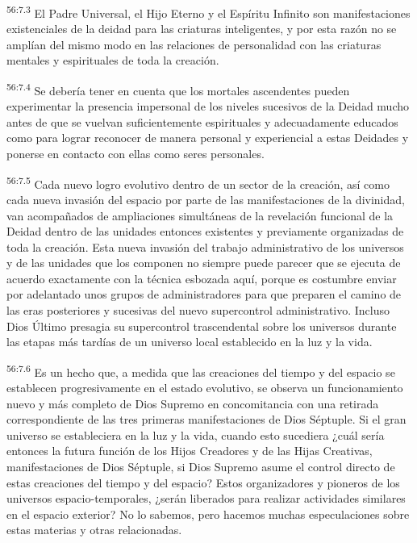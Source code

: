 \par
\textsuperscript{56:7.3} El Padre Universal, el Hijo Eterno y el Espíritu Infinito son manifestaciones existenciales de la deidad para las criaturas inteligentes, y por esta razón no se amplían del mismo modo en las relaciones de personalidad con las criaturas mentales y espirituales de toda la creación.

\par
\textsuperscript{56:7.4} Se debería tener en cuenta que los mortales ascendentes pueden experimentar la presencia impersonal de los niveles sucesivos de la Deidad mucho antes de que se vuelvan suficientemente espirituales y adecuadamente educados como para lograr reconocer de manera personal y experiencial a estas Deidades y ponerse en contacto con ellas como seres personales.

\par
\textsuperscript{56:7.5} Cada nuevo logro evolutivo dentro de un sector de la creación, así como cada nueva invasión del espacio por parte de las manifestaciones de la divinidad, van acompañados de ampliaciones simultáneas de la revelación funcional de la Deidad dentro de las unidades entonces existentes y previamente organizadas de toda la creación. Esta nueva invasión del trabajo administrativo de los universos y de las unidades que los componen no siempre puede parecer que se ejecuta de acuerdo exactamente con la técnica esbozada aquí, porque es costumbre enviar por adelantado unos grupos de administradores para que preparen el camino de las eras posteriores y sucesivas del nuevo supercontrol administrativo. Incluso Dios Último presagia su supercontrol trascendental sobre los universos durante las etapas más tardías de un universo local establecido en la luz y la vida.

\par
\textsuperscript{56:7.6} Es un hecho que, a medida que las creaciones del tiempo y del espacio se establecen progresivamente en el estado evolutivo, se observa un funcionamiento nuevo y más completo de Dios Supremo en concomitancia con una retirada correspondiente de las tres primeras manifestaciones de Dios Séptuple. Si el gran universo se estableciera en la luz y la vida, cuando esto sucediera ¿cuál sería entonces la futura función de los Hijos Creadores y de las Hijas Creativas, manifestaciones de Dios Séptuple, si Dios Supremo asume el control directo de estas creaciones del tiempo y del espacio? Estos organizadores y pioneros de los universos espacio-temporales, ¿serán liberados para realizar actividades similares en el espacio exterior? No lo sabemos, pero hacemos muchas especulaciones sobre estas materias y otras relacionadas.

